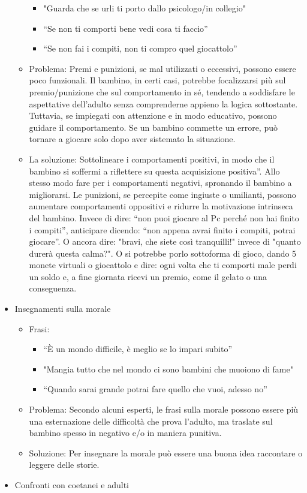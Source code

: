 \documentclass[12pt]{book} %
\begin{document}
\begin{itemize}
\begin{itemize}
\begin{itemize}
\item "Guarda che se urli ti porto dallo psicologo/in collegio"
\item “Se non ti comporti bene vedi cosa ti faccio”
\item “Se non fai i compiti, non ti compro quel giocattolo”
\end{itemize}
\item Problema: Premi e punizioni, se mal utilizzati o eccessivi, possono essere poco funzionali. Il bambino, in certi casi, potrebbe focalizzarsi più sul premio/punizione che sul comportamento in sé, tendendo a soddisfare le aspettative dell'adulto senza comprenderne appieno la logica sottostante. Tuttavia, se impiegati con attenzione e in modo educativo, possono guidare il comportamento. Se un bambino commette un errore, può tornare a giocare solo dopo aver sistemato la situazione.
\item La soluzione: Sottolineare i comportamenti positivi, in modo che il bambino si soffermi a riflettere su questa
acquisizione positiva”. Allo stesso modo fare per i comportamenti negativi, spronando il bambino a migliorarsi. 
Le punizioni, se percepite come ingiuste o umilianti, possono aumentare comportamenti oppositivi e ridurre la motivazione intrinseca del bambino.
Invece di dire: “non puoi giocare al Pc perché non hai finito i compiti”, anticipare dicendo: 
“non appena avrai finito i compiti, potrai giocare”. O ancora dire: "bravi, che siete così tranquilli!" invece di "quanto durerà questa calma?".
O si potrebbe porlo sottoforma di gioco, dando 5 monete virtuali o giocattolo e dire: ogni volta che ti comporti male perdi un soldo e, a fine giornata ricevi un premio, come il gelato o una conseguenza.
\end{itemize}
\item Insegnamenti sulla morale

\begin{itemize}
\item Frasi:

\begin{itemize}
\item “È un mondo difficile, è meglio se lo impari subito”
\item "Mangia tutto che nel mondo ci sono bambini che muoiono di fame"
\item “Quando sarai grande potrai fare quello che vuoi, adesso no”
\end{itemize}
\item Problema: Secondo alcuni esperti, le frasi sulla morale possono essere più una esternazione delle difficoltà che prova
l'adulto, ma traslate sul bambino spesso in negativo e/o in maniera punitiva.
\item Soluzione: Per insegnare la morale può essere una buona idea raccontare o leggere delle storie.
\end{itemize}
\item Confronti con coetanei e adulti


\end{itemize}
\end{document}
